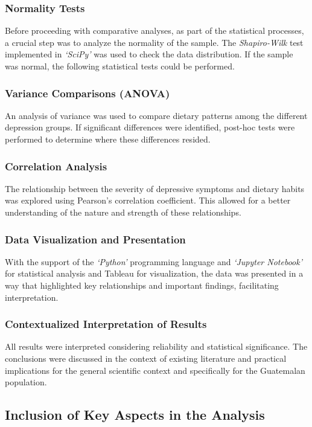 \documentclass[jou]{apa7}
\begin{document}
\subsubsection{Normality Tests}
Before proceeding with comparative analyses, as part of the statistical processes, a crucial step was to analyze the normality of the sample. The \emph{Shapiro-Wilk} test implemented in \emph{`SciPy'} was used to check the data distribution. If the sample was normal, the following statistical tests could be performed.

\subsubsection{Variance Comparisons (ANOVA)}
An analysis of variance was used to compare dietary patterns among the different depression groups. If significant differences were identified, post-hoc tests were performed to determine where these differences resided.

\subsubsection{Correlation Analysis}
The relationship between the severity of depressive symptoms and dietary habits was explored using Pearson's correlation coefficient. This allowed for a better understanding of the nature and strength of these relationships.

\subsubsection{Data Visualization and Presentation}
With the support of the \emph{`Python'} programming language and \emph{`Jupyter Notebook'} for statistical analysis and Tableau for visualization, the data was presented in a way that highlighted key relationships and important findings, facilitating interpretation.

\subsubsection{Contextualized Interpretation of Results}
All results were interpreted considering reliability and statistical significance. The conclusions were discussed in the context of existing literature and practical implications for the general scientific context and specifically for the Guatemalan population.

\subsection{Inclusion of Key Aspects in the Analysis}\label{inclusiuxf3n-de-aspectos-clave-en-el-anuxe1lisis}
\end{document}
